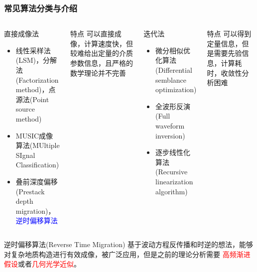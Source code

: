 \documentclass[8pt]{beamer}
\begin{document}
\begin{frame}
\frametitle{常见算法分类与介绍}
\begin{columns}
	
	
	\begin{block}{直接成像法}
		\begin{itemize}
			\item 线性采样法(LSM)，分解法(Factorization method)，点源法(Point source method)
			\item MUSIC成像算法(MUltiple SIgnal Classification)
			\item 叠前深度偏移(Prestack depth migration)，\textcolor{blue}{逆时偏移算法}
		\end{itemize}
		
	\end{block}
	\begin{block}{特点}
		可以直接成像，计算速度快，但较难给出定量的介质参数信息，且严格的数学理论并不完善
	\end{block}
	
	\begin{block}{迭代法}
		\begin{itemize}
			\item 微分相似优化算法(Differential semblance optimization)
			\item 全波形反演(Full waveform inversion)
			\item 逐步线性化算法(Recursive linearization algorithm)
		\end{itemize}
	\end{block}
	\begin{block}{特点}
		可以得到定量信息，但是需要先验信息，计算耗时，收敛性分析困难
	\end{block}
\end{columns}
\begin{block}{逆时偏移算法(Reverse Time Migration)}
	基于波动方程反传播和时逆的想法，能够对复杂地质构造进行有效成像，被广泛应用，但是之前的理论分析需要
	\textcolor{red}{高频渐进假设}或者\textcolor{red}{几何光学近似}。
\end{block}
\end{frame}
\end{document}
